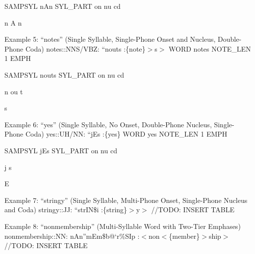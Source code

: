 \documentclass[10pt,oneside]{memoir}
\def\mybibliostyle{plain}
\def\bibliocommand{}
\begin{document}
SAMPSYL
nAn
SYL\_PART
on
nu
cd


n
A
n


\pagebreak Example 5: ``notes'' 
(Single Syllable, Single-Phone Onset and Nucleus, Double-Phone Coda)
notes::NNS/VBZ: ``nouts :\{note\}$>$s$>$
WORD
notes
NOTE\_LEN
1
EMPH


SAMPSYL
nouts
SYL\_PART
on
nu
cd


n
ou
t


s


Example 6: ``yes'' 
(Single Syllable, No Onset, Double-Phone Nucleus, Single-Phone Coda)
yes::UH/NN: ``jEs :\{yes\}
WORD
yes
NOTE\_LEN
1
EMPH


SAMPSYL
jEs
SYL\_PART
on
nu
cd


j
s


E


\pagebreak Example 7: ``stringy'' 
(Single Syllable, Multi-Phone Onset, Single-Phone Nucleus and Coda)
stringy::JJ: ``strIN\$i :\{string\}$>$y$>$
//TODO: INSERT TABLE


Example 8: ``nonmembership'' (Multi-Syllable Word with Two-Tier Emphases) 
nonmembership::NN: nAn''mEm\$b@`r\%SIp :$<$non$<$\{member\}$>$ship$>$
//TODO: INSERT TABLE


%
%

\backmatter


\bibliocommand

\printglossary


\printindex
\end{document}
